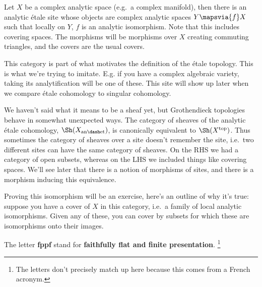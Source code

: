 \begin{example}[?]

Let \(X\) be a complex analytic space (e.g.~a complex manifold), then
there is an analytic étale site whose objects are complex analytic
spaces \(Y\mapsvia{f} X\) such that locally on \(Y\), \(f\) is an
analytic isomorphism. Note that this includes covering spaces. The
morphisms will be morphisms over \(X\) creating commuting triangles, and
the covers are the usual covers.

\end{example}

\begin{remark}

This category is part of what motivates the definition of the étale
topology. This is what we're trying to imitate. E.g. if you have a
complex algebraic variety, taking its analytification will be one of
these. This site will show up later when we compare étale cohomology to
singular cohomology.

\end{remark}

\begin{remark}

We haven't said what it means to be a sheaf yet, but Grothendieck
topologies behave in somewhat unexpected ways. The category of sheaves
of the analytic étale cohomology, \(\Sh(X_{\mathrm{an\dash et}})\), is
canonically equivalent to \(\Sh(X^{\mathrm{top}})\). Thus sometimes the
category of sheaves over a site doesn't remember the site, i.e.~two
different sites can have the same category of sheaves. On the RHS we had
a category of open subsets, whereas on the LHS we included things like
covering spaces. We'll see later that there is a notion of morphisms of
sites, and there is a morphism inducing this equivalence.

Proving this isomorphism will be an exercise, here's an outline of why
it's true: suppose you have a cover of \(X\) in this category, i.e.~a
family of local analytic isomorphisms. Given any of these, you can cover
by subsets for which these are isomorphisms onto their images.

\end{remark}

\begin{definition}[fppf]

The letter \textbf{fppf} stand for \textbf{faithfully flat and finite
presentation}. \footnote{The letters don't precisely match up here
  because this comes from a French acronym.}

\end{definition}

